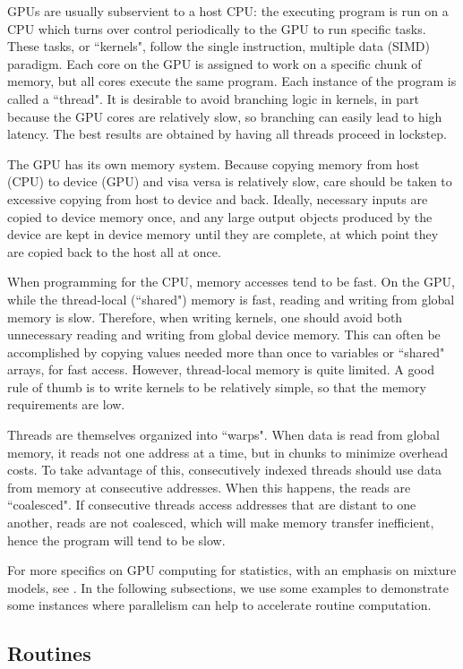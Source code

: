 {GPUs are usually subservient to a host CPU: the executing program is run on a CPU which turns over control periodically to the GPU to run specific tasks. These tasks, or ``kernels", follow the single instruction, multiple data (SIMD) paradigm. Each core on the GPU is assigned to work on a specific chunk of memory, but all cores execute the same program. Each instance of the program is called a ``thread". It is desirable to avoid branching logic in kernels, in part because the GPU cores are relatively slow, so branching can easily lead to high latency. The best results are obtained by having all threads proceed in lockstep.

The GPU has its own memory system. Because copying memory from host (CPU) to device (GPU) and visa versa is relatively slow, care should be taken to excessive copying from host to device and back. Ideally, necessary inputs are copied to device memory once, and any large output objects produced by the device are kept in device memory until they are complete, at which point they are copied back to the host all at once.

When programming for the CPU, memory accesses tend to be fast. On the GPU, while the thread-local (``shared") memory is fast, reading and writing from global memory is slow. Therefore, when writing kernels, one should avoid both unnecessary reading and writing from global device memory. This can often be accomplished by copying values needed more than once to variables or ``shared" arrays, for fast access. However, thread-local memory is quite limited. A good rule of thumb is to write kernels to be relatively simple, so that the memory requirements are low.

Threads are themselves organized into ``warps". When data is read from global memory, it reads not one address at a time, but in chunks to minimize overhead costs. To take advantage of this, consecutively indexed threads should use data from memory at consecutive addresses. When this happens, the reads are ``coalesced". If consecutive threads access addresses that are distant to one another, reads are not coalesced, which will make memory transfer inefficient, hence the program will tend to be slow.

For more specifics on GPU computing for statistics, with an emphasis on mixture models, see \citet{suchard}. In the following subsections, we use some examples to demonstrate some instances where parallelism can help to accelerate routine computation.

\subsection{Routines}
\label{sec:routines}
}
